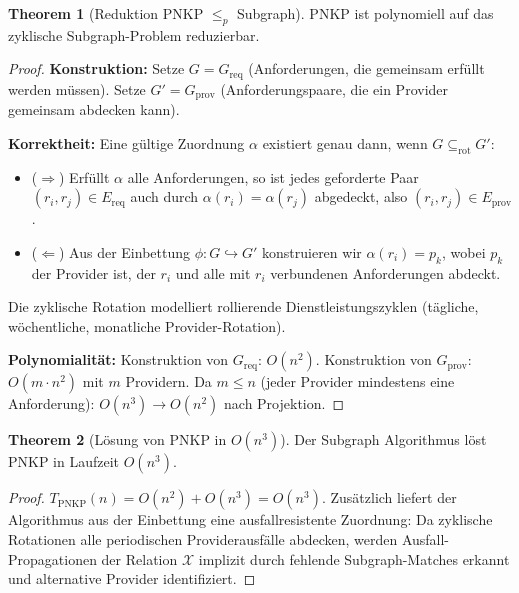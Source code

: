 ﻿\documentclass[a4paper,12pt]{article}
\theoremstyle{definition}
\newtheorem{theorem}{Theorem}[section]
\begin{document}
\begin{theorem}[Reduktion PNKP $\leq_p$ Subgraph]
\label{thm:pnkp-red}
PNKP ist polynomiell auf das zyklische Subgraph-Problem reduzierbar.
\end{theorem}

\begin{proof}
\textbf{Konstruktion:}
Setze $G = G_{\mathrm{req}}$ (Anforderungen, die gemeinsam erfüllt werden müssen).
Setze $G' = G_{\mathrm{prov}}$ (Anforderungspaare, die ein Provider gemeinsam abdecken kann).

\textbf{Korrektheit:}
Eine gültige Zuordnung $\alpha$ existiert genau dann, wenn $G \subseteq_{\mathrm{rot}} G'$:
\begin{itemize}
    \item ($\Rightarrow$) Erfüllt $\alpha$ alle Anforderungen, so ist jedes geforderte
          Paar $(r_i, r_j) \in E_{\mathrm{req}}$ auch durch $\alpha(r_i) = \alpha(r_j)$
          abgedeckt, also $(r_i, r_j) \in E_{\mathrm{prov}}$.
    \item ($\Leftarrow$) Aus der Einbettung $\phi: G \hookrightarrow G'$ konstruieren wir
          $\alpha(r_i) = p_k$, wobei $p_k$ der Provider ist, der $r_i$ und alle mit $r_i$
          verbundenen Anforderungen abdeckt.
\end{itemize}
Die zyklische Rotation modelliert rollierende Dienstleistungszyklen
(tägliche, wöchentliche, monatliche Provider-Rotation).

\textbf{Polynomialität:}
Konstruktion von $G_{\mathrm{req}}$: $O(n^2)$.
Konstruktion von $G_{\mathrm{prov}}$: $O(m \cdot n^2)$ mit $m$ Providern.
Da $m \leq n$ (jeder Provider mindestens eine Anforderung): $O(n^3) \to O(n^2)$
nach Projektion.
\end{proof}

\begin{theorem}[Lösung von PNKP in $O(n^3)$]
\label{thm:pnkp-sol}
Der Subgraph Algorithmus löst PNKP in Laufzeit $O(n^3)$.
\end{theorem}

\begin{proof}
$T_{\mathrm{PNKP}}(n) = O(n^2) + O(n^3) = O(n^3)$.
Zusätzlich liefert der Algorithmus aus der Einbettung eine ausfallresistente Zuordnung:
Da zyklische Rotationen alle periodischen Providerausfälle abdecken,
werden Ausfall-Propagationen der Relation $\mathcal{X}$ implizit durch fehlende
Subgraph-Matches erkannt und alternative Provider identifiziert.
\end{proof}

\end{document}
